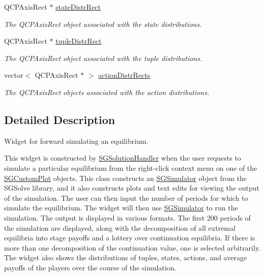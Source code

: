 \begin{DoxyCompactItemize}
\mbox{\label{classSGSimulationHandler_afce6339f388f8ff681137f0a0343e652}} 
Q\+C\+P\+Axis\+Rect $\ast$ \hyperlink{classSGSimulationHandler_afce6339f388f8ff681137f0a0343e652}{state\+Distr\+Rect}
\begin{DoxyCompactList}\small\item\em The Q\+C\+P\+Axis\+Rect object associated with the state distributions. \end{DoxyCompactList}\item 
\mbox{\label{classSGSimulationHandler_ae964d001d8c66f69768cae6d448cbfb2}} 
Q\+C\+P\+Axis\+Rect $\ast$ \hyperlink{classSGSimulationHandler_ae964d001d8c66f69768cae6d448cbfb2}{tuple\+Distr\+Rect}
\begin{DoxyCompactList}\small\item\em The Q\+C\+P\+Axis\+Rect object associated with the tuple distributions. \end{DoxyCompactList}\item 
\mbox{\label{classSGSimulationHandler_a359a9970707cbf53f14ebb3f86fd9d0a}} 
vector$<$ Q\+C\+P\+Axis\+Rect $\ast$ $>$ \hyperlink{classSGSimulationHandler_a359a9970707cbf53f14ebb3f86fd9d0a}{action\+Distr\+Rects}
\begin{DoxyCompactList}\small\item\em The Q\+C\+P\+Axis\+Rect objects associated with the action distributions. \end{DoxyCompactList}\end{DoxyCompactItemize}


\subsection{Detailed Description}
Widget for forward simulating an equilibrium. 

This widget is constructed by \hyperlink{classSGSolutionHandler}{S\+G\+Solution\+Handler} when the user requests to simulate a particular equilibrium from the right-\/click context menu on one of the \hyperlink{classSGCustomPlot}{S\+G\+Custom\+Plot} objects. This class constructs an \hyperlink{classSGSimulator}{S\+G\+Simulator} object from the S\+G\+Solve library, and it also constructs plots and text edits for viewing the output of the simulation. The user can then input the number of periods for which to simulate the equilibrium. The widget will then use \hyperlink{classSGSimulator}{S\+G\+Simulator} to run the simulation. The output is displayed in various formats. The first 200 periods of the simulation are displayed, along with the decomposition of all extremal equilibria into stage payoffs and a lottery over continuation equilibria. If there is more than one decomposition of the continuation value, one is selected arbitrarily. The widget also shows the distributions of tuples, states, actions, and average payoffs of the players over the course of the simulation. 

